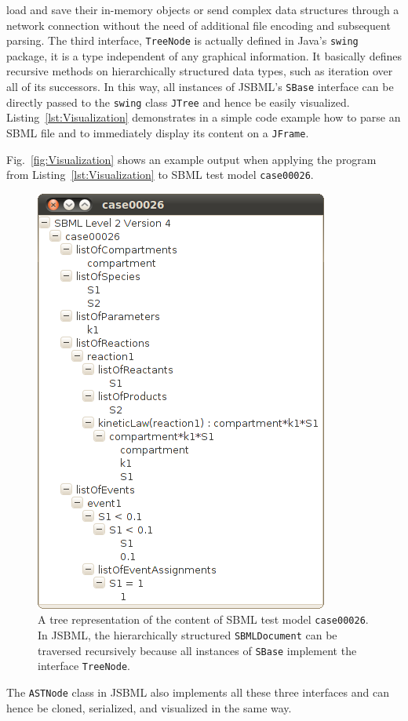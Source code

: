 \documentclass[
  BCOR12mm,
  letterpaper,
  11pt,
  headsepline,
  pointlessnumbers,
  tablecaptionabove,
  onelinecaption,
  headinclude,
  appendixprefix,
  idxtotoc,
  bibtotoc,
  twoside,
  titlepage
]{scrartcl}
\begin{document}
load and save their in-memory objects or send complex data structures
through a network connection without the need of additional file encoding and
subsequent parsing. The third interface, \texttt{TreeNode} is actually defined
in Java's \texttt{swing} package,
it is a type independent of any graphical information. It basically defines
recursive methods on hierarchically structured data types, such as iteration
over all of its successors. In this way, all instances of
JSBML's \texttt{SBase} interface can be directly passed to
the \texttt{swing} class
\texttt{JTree} and hence be
easily visualized.
Listing~\vref{lst:Visualization} demonstrates in a simple code example how to
parse an SBML file and to immediately display its content
on a \texttt{JFrame}.

Fig.~\vref{fig:Visualization} shows an example output when applying the program
from Listing~\vref{lst:Visualization} to SBML test model \texttt{case00026}.
\begin{figure}
\includegraphics[width=.35\textwidth]{posters/2010_ICSB_and_COMBINE/JSBMLvisualizerTransparent}
\caption[Tree representation of an SBML file]{A tree representation of the
content of SBML test model \texttt{case00026}. In JSBML, the hierarchically
structured \texttt{SBMLDocument} can be traversed recursively because all
instances of \texttt{SBase} implement the interface \texttt{TreeNode}.}
\label{fig:Visualization}
\end{figure}
The \texttt{ASTNode} class in JSBML also implements all these three interfaces and
can hence be cloned, serialized, and visualized in the same way.
\end{document}
